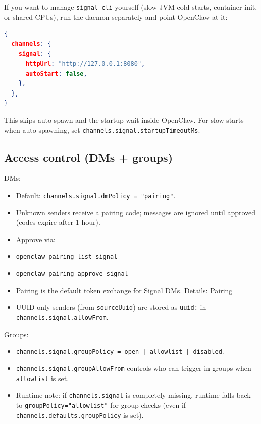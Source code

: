 If you want to manage \texttt{signal-cli} yourself (slow JVM cold starts, container init, or shared CPUs), run the daemon separately and point OpenClaw at it:

\begin{lstlisting}[language=json]
{
  channels: {
    signal: {
      httpUrl: "http://127.0.0.1:8080",
      autoStart: false,
    },
  },
}
\end{lstlisting}


This skips auto-spawn and the startup wait inside OpenClaw. For slow starts when auto-spawning, set \texttt{channels.signal.startupTimeoutMs}.

\subsection{Access control (DMs + groups)}


DMs:

\begin{itemize}
  \item Default: \texttt{channels.signal.dmPolicy = "pairing"}.
  \item Unknown senders receive a pairing code; messages are ignored until approved (codes expire after 1 hour).
  \item Approve via:
  \item \texttt{openclaw pairing list signal}
  \item \texttt{openclaw pairing approve signal }
  \item Pairing is the default token exchange for Signal DMs. Details: \href{/channels/pairing}{Pairing}
  \item UUID-only senders (from \texttt{sourceUuid}) are stored as \texttt{uuid:} in \texttt{channels.signal.allowFrom}.
\end{itemize}


Groups:

\begin{itemize}
  \item \texttt{channels.signal.groupPolicy = open | allowlist | disabled}.
  \item \texttt{channels.signal.groupAllowFrom} controls who can trigger in groups when \texttt{allowlist} is set.
  \item Runtime note: if \texttt{channels.signal} is completely missing, runtime falls back to \texttt{groupPolicy="allowlist"} for group checks (even if \texttt{channels.defaults.groupPolicy} is set).
\end{itemize}



